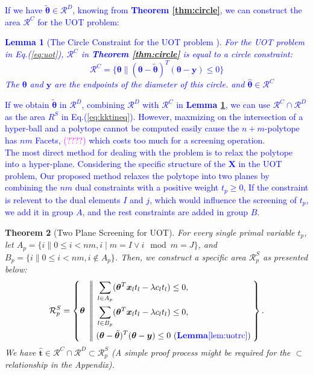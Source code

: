 \documentclass[twoside]{article}
\theoremstyle{plain}
\newtheorem{thm}{Theorem}
\newtheorem{lem}[thm]{Lemma}
\newcommand{\tranT}{T}
\newcommand{\mat}[1]{\mathbf{#1}}
\renewcommand{\vec}[1]{\bm{#1}}
\newcommand{\changeXS}[1]{\textcolor{blue}{#1}}
\newcommand{\note}[1]{\textcolor{magenta}{#1}}
\begin{document}
\changeXS{If we have $\tilde{\vec{\theta}} \in \mathcal{R}^{D}$, knowing from {\bf Theorem \ref{thm:circle}}, we can construct the area $\mathcal{R}^{C}$ for the UOT problem:
\begin{lem}[The Circle Constraint for the UOT problem {\citep[Theorem 8]{NEURIPS2021_7b5b23f4}}]
\label{lem:uotrc}
For the UOT problem in Eq.(\ref{eq:uot}), $\mathcal{R}^{C}$ in {\bf Theorem \ref{thm:circle}} is equal to a circle constraint:
\begin{equation}
\mathcal{R}^{C} =\{\vec\theta\|(\vec{\theta}-\tilde{\vec{\theta}})^{\tranT}(\vec{\theta}-\vec{y})\leq 0\}
\label{eq:uotcircle}
\end{equation}
The $\vec\theta$ and $\vec y$ are the endpoints of the diameter of this circle. and $\hat{ \vec\theta} \in \mathcal{R}^{C}$
\end{lem}
If we obtain $\tilde{\vec{\theta}}$ in $\mathcal{R}^{D}$, combining $\mathcal{R}^{D}$ with $\mathcal{R}^{C}$ in {\bf Lemma \ref{lem:uotrc}}, we can use $\mathcal{R}^{C}\cap\mathcal{R}^{D}$ as the area $R^{S}$ in Eq.(\ref{eq:kktineq}). However, maxmizing on the intersection of a hyper-ball and a polytope cannot be computed easily cause the $n+m$-polytope has $nm$ Facets, \note{(????)} which costs too much for a screening operation.\\
The most direct method for dealing with the problem is to relax the polytope into a hyper-plane. Considering the specific structure of the $\mat X$ in the UOT problem, Our proposed method relaxes the polytope into two planes by combining the $nm$ dual constraints with a positive weight $t_p \geq 0$, If the constraint is relevent to the dual elements $I$ and $j$, which would influence the screening of $t_p$, we add it in group $A$, and the rest constraints are added in group $B$.}

\begin{thm}[Two Plane Screening for UOT]
\label{Thm:AreaScreeningUOT}
For every single primal variable $t_p$, let $A_p = \{ i \| 0\leq i<nm, i\mid m = I \vee i\mod m = J\}$, and $B_p = \{ i \| 0\leq i<nm, i \notin A_p\}$. Then, we construct a specific area $\mathcal{R}^{S}_{p}$ as presented below:
 \begin{equation}
\begin{split} 
\mathcal{R}^S_{p} = \left\{\vec{\theta} \ \left|\!\left| \ 
\begin{aligned}
 &\sum_{l\in A_p}(\vec{\theta}^{\tranT}\vec{x}_{l}{t_l} - \lambda {c}_l {t_l})\leq 0, \\
 &\sum_{l\in B_p}(\vec{\theta}^{\tranT}\vec{x}_{l}{t_l} - \lambda {c}_l {t_l})\leq 0, \\
  &(\vec{\theta}-\tilde{\vec{\theta}})^{\tranT}(\vec{\theta}-\vec{y})\leq 0 \ (\changeXS{\bf Lemma  \ref{lem:uotrc}})
\end{aligned}
\right.\right.
\right\}.
\end{split}
\label{eq:divide}
\end{equation}
We have $\hat{\vec{t}} \in \mathcal{R}^{C}\cap\mathcal{R}^{D} \subset \mathcal{R}^{S}_{p}$ (A simple proof process might be required for the $\subset$ relationship in the Appendix).
\end{thm}
\end{document}
